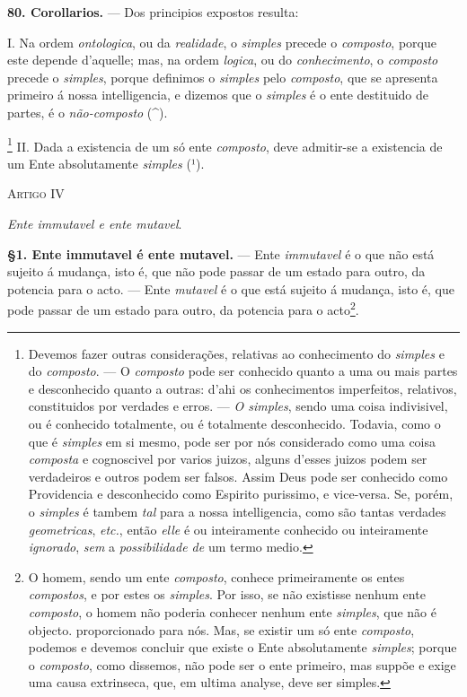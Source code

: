 \textbf{80. Corollarios.} --- Dos principios expostos resulta:

I. Na ordem \emph{ontologica}, ou da \emph{realidade}, o \emph{simples} precede o \emph{composto}, porque este depende d'aquelle; mas, na ordem \emph{logica}, ou do \emph{conhecimento}, o \emph{composto} precede o \emph{simples}, porque definimos o \emph{simples} pelo \emph{composto}, que se apresenta primeiro á nossa intelligencia, e dizemos que o \emph{simples} é o ente destituido de partes, é o \emph{não-composto} (\textasciicircum{}).

\footnote{Devemos fazer outras considerações, relativas ao conhecimento do \emph{simples} e do \emph{composto}. --- O \emph{composto} pode ser conhecido quanto a uma ou mais partes e desconhecido quanto a outras: d'ahi os conhecimentos imperfeitos, relativos, constituidos por verdades e erros. --- \emph{O simples}, sendo uma coisa indivisivel, ou é conhecido totalmente, ou é totalmente desconhecido. Todavia, como o que é \emph{simples} em si mesmo, pode ser por nós considerado como uma coisa \emph{composta} e cognoscivel por varios juizos, alguns d'esses juizos podem ser verdadeiros e outros podem ser falsos. Assim Deus pode ser conhecido como Providencia e desconhecido como Espirito purissimo, e vice-versa. Se, porém, o \emph{simples} é tambem \emph{tal} para a nossa intelligencia, como são tantas verdades \emph{geometricas}, \emph{etc.}, então \emph{elle} é ou inteiramente conhecido ou inteiramente \emph{ignorado}, \emph{sem} a \emph{possibilidade de} um termo medio.\par}
 II. Dada a existencia de um só ente \emph{composto}, deve admitir-se a existencia de um Ente absolutamente \emph{simples} (¹).

\textsc{Artigo} IV

\emph{Ente immutavel e ente mutavel}.

\textbf{§1. Ente immutavel é ente mutavel.} --- Ente \emph{immutavel} é o que não está sujeito á mudança, isto é, que não pode passar de um estado para outro, da potencia para o acto. --- Ente \emph{mutavel} é o que está sujeito á mudança, isto é, que pode passar de um estado para outro, da potencia para o acto\footnote{O homem, sendo um ente \emph{composto}, conhece primeiramente os entes \emph{compostos}, e por estes os \emph{simples}. Por isso, se não existisse nenhum ente \emph{composto}, o homem não poderia conhecer nenhum ente \emph{simples}, que não é objecto. proporcionado para nós. Mas, se existir um só ente \emph{composto}, podemos e devemos concluir que existe o Ente absolutamente \emph{simples}; porque o \emph{composto}, como dissemos, não pode ser o ente primeiro, mas suppõe e exige uma causa extrinseca, que, em ultima analyse, deve ser simples.}.

